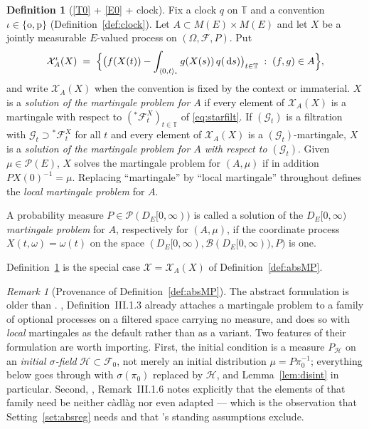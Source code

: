 \documentclass[11pt,a4paper]{article}
\theoremstyle{plain}
\theoremstyle{definition}
\newtheorem{definition}[theorem]{Definition}
\theoremstyle{remark}
\newtheorem{remark}[theorem]{Remark}
\newcommand{\T}{\mathbb{T}}                     %
\newcommand{\Bor}{\mathcal{B}}                 %
\newcommand{\Meas}{M}                          %
\newcommand{\Prob}{\mathcal{P}}                %
\newcommand{\DE}{D_E[0,\infty)}
\newcommand{\Filt}{\mathcal{F}}
\newcommand{\Gilt}{\mathcal{G}}
\newcommand{\XX}{\mathcal{X}}                  %
\newcommand{\dif}{\,\mathrm{d}}
\newcommand{\CPS}{\cite{CPS23}}
\newcommand{\JS}{\cite{JS03}}
\begin{document}
\begin{definition}[\eqref{T0} + \eqref{E0} + clock]
  \label{def:markovMP}
  Fix a clock $q$ on $\T$ and a convention $\iota \in \{\mathrm{o},\mathrm{p}\}$
  (Definition~\ref{def:clock}).  Let $A \subset \Meas(E) \times \Meas(E)$ and let
  $X$ be a jointly measurable $E$-valued process on $(\Omega,\Filt,P)$.  Put
  \begin{equation}
    \label{eq:XXA}
    \XX^\iota_A(X) \;=\;
      \Bigl\{ \bigl( f(X(t))
        - \int_{\langle 0,t \rangle_\iota} g(X(s)) \, q(\dif s) \bigr)_{t \in \T}
              \;:\; (f,g) \in A \Bigr\} ,
  \end{equation}
  and write $\XX_A(X)$ when the convention is fixed by the context or immaterial.
  $X$ is a \emph{solution of the martingale problem for $A$} if every element of
  $\XX_A(X)$ is a martingale with respect to $({}^{*}\Filt^X_t)_{t \in \T}$ of
  \eqref{eq:starfilt}.  If $(\Gilt_t)$ is a filtration with
  $\Gilt_t \supset {}^{*}\Filt^X_t$ for all $t$ and every element of $\XX_A(X)$
  is a $(\Gilt_t)$-martingale, $X$ is a \emph{solution of the martingale problem
  for $A$ with respect to $(\Gilt_t)$}.  Given $\mu \in \Prob(E)$, $X$ solves the
  martingale problem for $(A,\mu)$ if in addition $P X(0)^{-1} = \mu$.
  Replacing ``martingale'' by ``local martingale'' throughout defines the
  \emph{local martingale problem} for $A$.

  A probability measure $P \in \Prob(\DE)$ is called a solution of the
  \emph{$\DE$ martingale problem} for $A$, respectively for $(A,\mu)$, if the
  coordinate process $X(t,\omega) = \omega(t)$ on the space
  $(\DE, \Bor(\DE), P)$ is one.
\end{definition}

Definition~\ref{def:markovMP} is the special case $\XX = \XX_A(X)$ of
Definition~\ref{def:absMP}.

\begin{remark}[Provenance of Definition~\ref{def:absMP}]
  \label{rem:absMPprov}
  The abstract formulation is older than \CPS.  \JS, Definition~III.1.3 already
  attaches a martingale problem to a family of optional processes
  on a filtered space carrying no measure, and does so with \emph{local}
  martingales as the default rather than as a variant.  Two features of their
  formulation are worth importing.  First, the initial condition is a measure
  $P_{\mathcal{H}}$ on an \emph{initial $\sigma$-field} $\mathcal{H} \subset \Filt_0$,
  not merely an initial distribution $\mu = P\pi_0^{-1}$; everything below goes
  through with $\sigma(\pi_0)$ replaced by $\mathcal{H}$, and
  Lemma~\ref{lem:disint} in particular.  Second, \JS, Remark~III.1.6 notes
  explicitly that the elements of that family need be neither c\`adl\`ag nor
  even adapted --- which is the observation that Setting~\ref{set:absreg} needs
  and that \CPS's standing assumptions exclude.
\end{remark}
\end{document}
